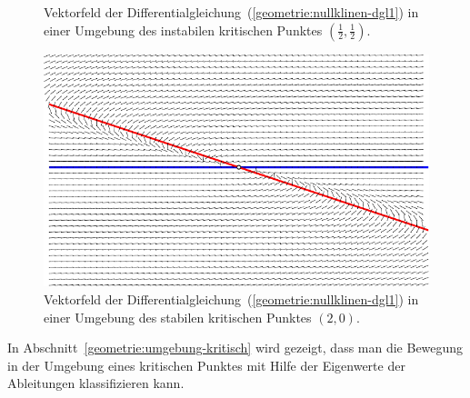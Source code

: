 \begin{beispiel}
\begin{figure}
\caption{Vektorfeld der Differentialgleichung~(\ref{geometrie:nullklinen-dgl1})
in einer Umgebung des instabilen kritischen Punktes $(\frac12,\frac12)$.
\label{geometrie:nullklinen-instabil}}
\end{figure}
\begin{figure}
\centering
\includegraphics{chapters/images/nullklinen-4.pdf}
\caption{Vektorfeld der Differentialgleichung~(\ref{geometrie:nullklinen-dgl1})
in einer Umgebung des stabilen kritischen Punktes $(2,0)$.
\label{geometrie:nullklinen-stabil}}
\end{figure}
In Abschnitt~\ref{geometrie:umgebung-kritisch} wird gezeigt, dass man 
die Bewegung in der Umgebung eines kritischen Punktes mit Hilfe der
Eigenwerte der Ableitungen klassifizieren kann.
\end{beispiel}


